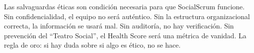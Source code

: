 \medskip

Las salvaguardas éticas son condición necesaria para que SocialScrum funcione. Sin confidencialidad, el equipo no será auténtico. Sin la estructura organizacional correcta, la información se usará mal. Sin auditoría, no hay verificación. Sin prevención del ``Teatro Social'', el Health Score será una métrica de vanidad. La regla de oro: si hay duda sobre si algo es ético, no se hace.